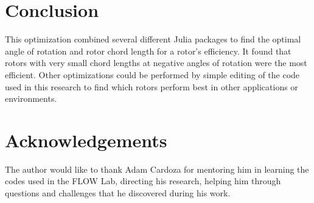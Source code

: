 \documentclass[journal ]{new-aiaa}
\begin{document}
\section{Conclusion}

This optimization combined several different Julia packages to find the optimal angle of rotation and rotor chord length for a rotor's efficiency. It found that rotors with very small chord lengths at negative angles of rotation were the most efficient. Other optimizations could be performed by simple editing of the code used in this research to find which rotors perform best in other applications or environments. 


\section{Acknowledgements}

The author would like to thank Adam Cardoza for mentoring him in learning the codes used in the FLOW Lab, directing his research, helping him through questions and challenges that he discovered during his work.




\end{document}
